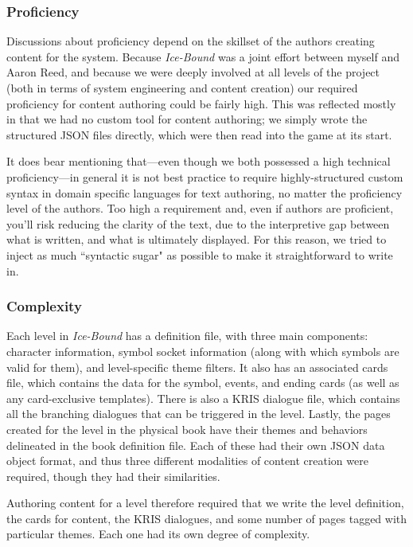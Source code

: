 \subsubsection{Proficiency}\label{subsubsec:icebound-proficiency}

Discussions about proficiency depend on the skillset of the authors creating content for the system. Because \textit{Ice-Bound} was a joint effort between myself and Aaron Reed, and because we were deeply involved at all levels of the project (both in terms of system engineering and content creation) our required proficiency for content authoring could be fairly high. This was reflected mostly in that we had no custom tool for content authoring; we simply wrote the structured JSON files directly, which were then read into the game at its start. 

It does bear mentioning that---even though we both possessed a high technical proficiency---in general it is not best practice to require highly-structured custom syntax in domain specific languages for text authoring, no matter the proficiency level of the authors. Too high a requirement and, even if authors are proficient, you'll risk reducing the clarity of the text, due to the interpretive gap between what is written, and what is ultimately displayed. For this reason, we tried to inject as much ``syntactic sugar" as possible to make it straightforward to write in.

\subsubsection{Complexity}\label{subsubsec:icebound-complexity}

Each level in \textit{Ice-Bound} has a definition file, with three main components: character information, symbol socket information (along with which symbols are valid for them), and level-specific theme filters. It also has an associated cards file, which contains the data for the symbol, events, and ending cards (as well as any card-exclusive templates). There is also a KRIS dialogue file, which contains all the branching dialogues that can be triggered in the level. Lastly, the pages created for the level in the physical book have their themes and behaviors delineated in the book definition file. Each of these had their own JSON data object format, and thus three different modalities of content creation were required, though they had their similarities.

Authoring content for a level therefore required that we write the level definition, the cards for content, the KRIS dialogues, and some number of pages tagged with particular themes. Each one had its own degree of complexity.

